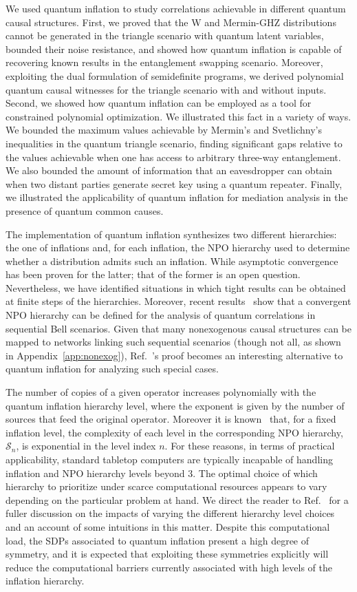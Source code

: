\documentclass[superscriptaddress,aps,prx,nofootinbib,twocolumn,twoside,reprint,letterpaper,longbibliography]{revtex4-2}
\begin{document}
We used quantum inflation to study correlations achievable in different quantum causal structures.
First, we proved that the W and Mermin-GHZ distributions cannot be generated in the triangle scenario with quantum latent variables, bounded their noise resistance, and showed how quantum inflation is capable of recovering known results in the entanglement swapping scenario.
Moreover, exploiting the dual formulation of semidefinite programs, we derived polynomial quantum causal witnesses for the triangle scenario with and without inputs.
Second, we showed how quantum inflation can be employed as a tool for constrained polynomial optimization.
We illustrated this fact in a variety of ways.
We bounded the maximum values achievable by Mermin's and Svetlichny's inequalities in the quantum triangle scenario, finding significant gaps relative to the values achievable when one has access to arbitrary three-way entanglement.
We also bounded the amount of information that an eavesdropper can obtain when two distant parties generate secret key using a quantum repeater.
Finally, we illustrated the applicability of quantum inflation for mediation analysis in the presence of quantum common causes.

The implementation of quantum inflation synthesizes two different hierarchies: the one of inflations and, for each inflation, the NPO hierarchy used to determine whether a distribution admits such an inflation.
While asymptotic convergence has been proven for the latter; that of the former is an open question.
Nevertheless, we have identified situations in which tight results can be obtained at finite steps of the hierarchies.
Moreover, recent results~\cite{bowles2020bounding} show that a convergent NPO hierarchy can be defined for the analysis of quantum correlations in sequential Bell scenarios. Given that many nonexogenous causal structures can be mapped to networks linking such sequential scenarios (though not all, as shown in Appendix~\ref{app:nonexog}), Ref.~\cite{bowles2020bounding}'s proof becomes an interesting alternative to quantum inflation for analyzing such special cases.

The number of copies of a given operator increases polynomially with the quantum inflation hierarchy level, where the exponent is given by the number of sources that feed the original operator.
Moreover it is known~\cite{npa2} that, for a fixed inflation level, the complexity of each level in the corresponding NPO hierarchy, $\mathcal{S}_n$, is exponential in the level index $n$.
For these reasons, in terms of practical applicability, standard tabletop computers are typically incapable of handling inflation and NPO hierarchy levels beyond 3.
The optimal choice of which hierarchy to prioritize under scarce computational resources appears to vary depending on the particular problem at hand.
We direct the reader to Ref.~\cite[Chap. 5]{alexThesis} for a fuller discussion on the impacts of varying the different hierarchy level choices and an account of some intuitions in this matter.
Despite this computational load, the SDPs associated to quantum inflation present a high degree of symmetry, and it is expected that exploiting these symmetries explicitly will reduce the computational barriers currently associated with high levels of the inflation hierarchy.
\end{document}
